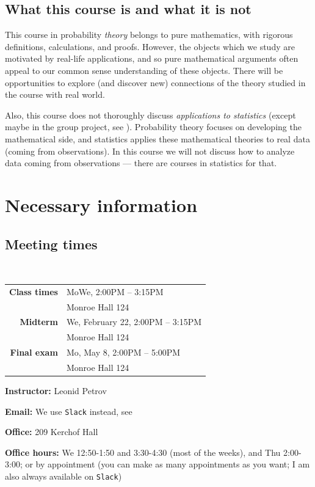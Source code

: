 \documentclass[oneside,11pt]{amsart}
\begin{document}
\subsection*{What this course is and what it is not}

This course in probability \emph{theory} belongs to pure mathematics, with
rigorous definitions, calculations, and proofs. However, the objects which we
study are motivated by real-life applications, and so pure mathematical
arguments often appeal to our common sense understanding of these objects.
There will be opportunities to explore (and discover new) connections of the
theory studied in the course with real world.

Also, this course does not thoroughly discuss \emph{applications to statistics}
(except maybe in the group project, see ).  Probability
theory focuses on developing the mathematical side, and statistics applies
these mathematical theories to real data (coming from observations). In this
course we will not discuss how to analyze data coming from observations ---
there are courses in statistics for that.

\section{Necessary information}

\subsection{Meeting times}{\ }\\

\begin{tabular}{|r|l|}
	\hline
	\textbf{Class times}  & MoWe, 2:00PM -- 3:15PM
                       \\  & Monroe Hall 124
                       \\ \hline
	\textbf{Midterm}   & We, February 22, 2:00PM -- 3:15PM
                       \\  & Monroe Hall 124
                       \\ \hline
	\textbf{Final exam}   & Mo, May 8, 2:00PM -- 5:00PM
                       \\  & Monroe Hall 124
                       \\ \hline
\end{tabular}
\hspace{10pt}\parbox{.42\textwidth}
{

	\textbf{Instructor:} Leonid Petrov

	\textbf{Email:} We use \texttt{Slack} instead, see 

	\textbf{Office:} 209 Kerchof Hall

	\textbf{Office hours:} We 12:50-1:50 and 3:30-4:30 (most of the weeks),
	and Thu 2:00-3:00;
	or by appointment (you can make as many appointments as you want;
	I am also always available on \texttt{Slack})
}
\end{document}
